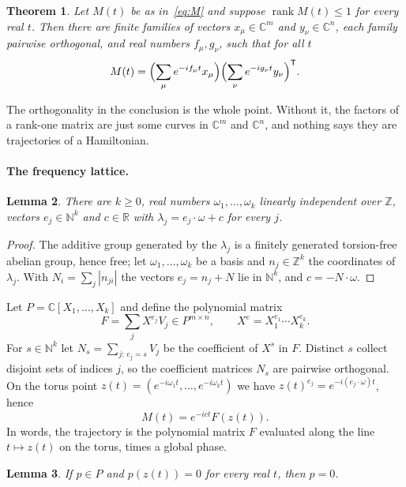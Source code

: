 \documentclass[11pt]{article}
\newtheorem{theorem}{Theorem}
\newtheorem{lemma}[theorem]{Lemma}
\theoremstyle{remark}
\newcommand{\C}{\mathbb{C}}
\newcommand{\R}{\mathbb{R}}
\newcommand{\Z}{\mathbb{Z}}
\newcommand{\N}{\mathbb{N}}
\begin{document}
\begin{theorem}\label{thm:sums}
Let $M(t)$ be as in~\eqref{eq:M} and suppose $\operatorname{rank}M(t)\le1$ for every real $t$.
Then there are finite families of vectors $x_\mu\in\C^m$ and $y_\nu\in\C^n$, each family
pairwise orthogonal, and real numbers $f_\mu,g_\nu$, such that for all $t$
\[
M(t)=\Bigl(\sum_\mu e^{-if_\mu t}x_\mu\Bigr)\Bigl(\sum_\nu e^{-ig_\nu t}y_\nu\Bigr)^{\mathsf T}.
\]
\end{theorem}

The orthogonality in the conclusion is the whole point. Without it, the factors of a rank-one
matrix are just some curves in $\C^m$ and $\C^n$, and nothing says they are trajectories of a
Hamiltonian.

\paragraph{The frequency lattice.}

\begin{lemma}\label{lem:lattice}
There are $k\ge0$, real numbers $\omega_1,\dots,\omega_k$ linearly independent over $\Z$,
vectors $e_j\in\N^k$ and $c\in\R$ with $\lambda_j=e_j\cdot\omega+c$ for every $j$.
\end{lemma}

\begin{proof}
The additive group generated by the $\lambda_j$ is a finitely generated torsion-free abelian
group, hence free; let $\omega_1,\dots,\omega_k$ be a basis and $n_j\in\Z^k$ the coordinates
of $\lambda_j$. With $N_i=\sum_j|n_{ji}|$ the vectors $e_j=n_j+N$ lie in $\N^k$, and
$c=-N\cdot\omega$.
\end{proof}

Let $P=\C[X_1,\dots,X_k]$ and define the polynomial matrix
\[
F=\sum_j X^{e_j}V_j\in P^{m\times n},\qquad X^{e}=X_1^{e_1}\cdots X_k^{e_k}.
\]
For $s\in\N^k$ let $N_s=\sum_{j:\,e_j=s}V_j$ be the coefficient of $X^s$ in $F$. Distinct $s$
collect disjoint sets of indices $j$, so the coefficient matrices $N_s$ are pairwise
orthogonal. On the torus point $z(t)=(e^{-i\omega_1t},\dots,e^{-i\omega_kt})$ we have
$z(t)^{e_j}=e^{-i(e_j\cdot\omega)t}$, hence
\begin{equation}\label{eq:torus}
M(t)=e^{-ict}F(z(t)).
\end{equation}
In words, the trajectory is the polynomial matrix $F$ evaluated along the line $t\mapsto z(t)$
on the torus, times a global phase.

\begin{lemma}\label{lem:dedekind}
If $p\in P$ and $p(z(t))=0$ for every real $t$, then $p=0$.
\end{lemma}
\end{document}
